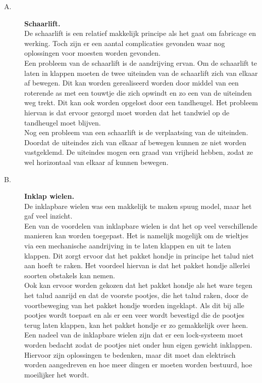 \begin{description}

\item[A.] {\bf Schaarlift.}\\
De schaarlift is een relatief makkelijk principe als het gaat om fabricage en werking. Toch zijn er een aantal complicaties gevonden waar nog oplossingen voor moesten worden gevonden. \\
Een probleem van de schaarlift is de aandrijving ervan. Om de schaarlift te laten in klappen moeten de twee uiteinden van de schaarlift zich van elkaar af bewegen. Dit kan worden gerealiseerd worden door middel van een roterende as met een touwtje die zich opwindt en zo een van de uiteinden weg trekt. Dit kan ook worden opgelost door een tandheugel. Het probleem hiervan is dat ervoor gezorgd moet worden dat het tandwiel op de tandheugel moet blijven. \\
Nog een probleem van een schaarlift is de verplaatsing van de uiteinden. Doordat de uiteindes zich van elkaar af bewegen kunnen ze niet worden vastgeklemd. De uiteindes mogen een graad van vrijheid hebben, zodat ze wel horizontaal van elkaar af kunnen bewegen. \\ 

\item[B.] {\bf Inklap wielen.}\\
De inklapbare wielen was een makkelijk te maken spuug model, maar het gaf veel inzicht. \\ 
Een van de voordelen van inklapbare wielen is dat  het op veel verschillende manieren kan worden toegepast. Het is namelijk mogelijk om de wieltjes via een mechanische aandrijving in te laten klappen en uit te laten klappen. Dit zorgt ervoor dat het pakket hondje in principe het talud niet aan hoeft te raken. Het voordeel hiervan is dat het pakket hondje allerlei soorten obstakels kan nemen.\\
Ook kan ervoor worden gekozen dat het pakket hondje als het ware tegen het talud aanrijd en dat de voorste pootjes, die het talud raken, door de voortbeweging van het pakket hondje worden ingeklapt. Als dit bij alle pootjes wordt toepast en als er een veer wordt bevestigd die de pootjes terug laten klappen, kan het pakket hondje er zo gemakkelijk over heen. \\
Een nadeel van de inklapbare wielen zijn dat er een lock-systeem moet worden bedacht zodat de pootjes niet onder hun eigen gewicht inklappen. Hiervoor zijn oplossingen te bedenken, maar dit moet dan elektrisch worden aangedreven en hoe meer dingen er moeten worden bestuurd, hoe moeilijker het wordt.\\


\end{description}
